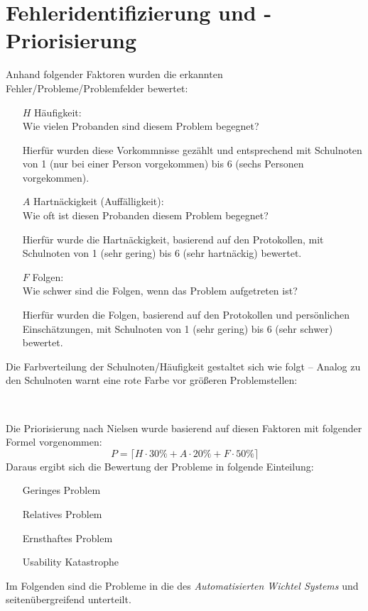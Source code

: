 \section{Fehleridentifizierung und -Priorisierung}
Anhand folgender Faktoren wurden die erkannten Fehler/Probleme/Problemfelder bewertet:
\begin{itemize}
\item[$H$] Häufigkeit:\\
Wie vielen Probanden sind diesem Problem begegnet? 

Hierfür wurden diese Vorkommnisse gezählt und entsprechend mit Schulnoten von 1 (nur bei einer Person vorgekommen) bis 6 (sechs Personen vorgekommen).
\item[$A$] Hartnäckigkeit (Auffälligkeit):\\
Wie oft ist diesen Probanden diesem Problem begegnet? 

Hierfür wurde die Hartnäckigkeit, basierend auf den Protokollen, mit Schulnoten von 1 (sehr gering) bis 6 (sehr hartnäckig) bewertet.
\item[$F$] Folgen:\\
Wie schwer sind die Folgen, wenn das Problem aufgetreten ist? 

Hierfür wurden die Folgen, basierend auf den Protokollen und persönlichen Einschätzungen, mit Schulnoten von 1 (sehr gering) bis 6 (sehr schwer) bewertet.
\end{itemize}
Die Farbverteilung der Schulnoten/Häufigkeit gestaltet sich wie folgt -- Analog zu den Schulnoten warnt eine rote Farbe vor größeren Problemstellen:
\begin{center}
\bewA ~
\bewAb ~
\bewB ~
\bewBc ~
\bewC ~
\bewCd ~
\bewD ~
\bewDe ~
\bewE ~
\bewEf ~
\bewF
\end{center}
Die Priorisierung nach Nielsen wurde basierend auf diesen Faktoren mit folgender Formel vorgenommen:
$$P=\lceil H\cdot 30\%+A\cdot 20\%+F \cdot 50\%\rceil$$
Daraus ergibt sich die Bewertung der Probleme in folgende Einteilung:
\begin{enumerate}[label=\arabic*]
\item[\nielA] Geringes Problem
\item[\nielB] Relatives Problem
\item[\nielC] Ernsthaftes Problem
\item[\nielD] Usability Katastrophe
\end{enumerate}

Im Folgenden sind die Probleme in die des \emph{Automatisierten Wichtel Systems} und seitenübergreifend unterteilt.

